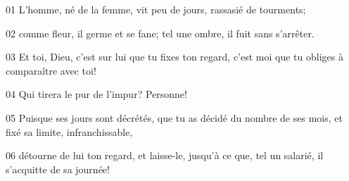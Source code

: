 01 L’homme, né de la femme, vit peu de jours, rassasié de tourments;

02 comme fleur, il germe et se fane; tel une ombre, il fuit sans s’arrêter.

03 Et toi, Dieu, c’est sur lui que tu fixes ton regard, c’est moi que tu obliges à comparaître avec toi!

04 Qui tirera le pur de l’impur? Personne!

05 Puisque ses jours sont décrétés, que tu as décidé du nombre de ses mois, et fixé sa limite, infranchissable,

06 détourne de lui ton regard, et laisse-le, jusqu’à ce que, tel un salarié, il s’acquitte de sa journée!